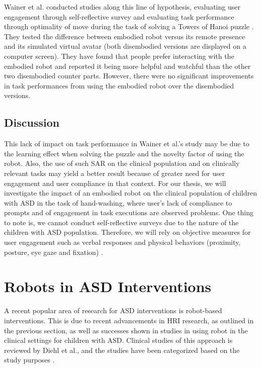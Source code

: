 \documentclass{ut-thesis}
\begin{document}
Wainer et al. conducted studies along this line of hypothesis, evaluating user engagement through self-reflective survey and evaluating task performance through optimality of move during the task of solving a Towers of Hanoi puzzle \cite{wainer2007embodiment}.  They tested the difference between embodied robot versus its remote presence and its simulated virtual avatar (both disembodied versions are displayed on a computer screen).  They have found that people prefer interacting with the embodied robot and reported it being more helpful and watchful than the other two disembodied counter parts.  However, there were no significant improvements in task performances from using the embodied robot over the disembodied versions.


\subsection{Discussion}
This lack of impact on task performance in Wainer et al.'s study may be due to the learning effect when solving the puzzle and the novelty factor of using the robot.  Also, the use of such SAR on the clinical population and on clinically relevant tasks may yield a better result because of greater need for user engagement and user compliance in that context.  For our thesis, we will investigate the impact of an embodied robot on the clinical population of children with ASD in the task of hand-washing, where user's lack of compliance to prompts and of engagement in task executions are observed problems.  One thing to note is, we cannot conduct self-reflective surveys due to the nature of the children with ASD population.  Therefore, we will rely on objective measures for user engagement such as verbal responses and physical behaviors (proximity, posture, eye gaze and ﬁxation) \cite{mataric2005role}.



\section{Robots in ASD Interventions}


A recent popular area of research for ASD interventions is robot-based interventions.  This is due to recent advancements in HRI research, as outlined in the previous section, as well as successes shown in studies in using robot in the clinical settings for children with ASD.  Clinical studies of this approach is reviewed by Diehl et al., and the studies have been categorized based on the study purposes \cite{diehl2012clinical}.
\end{document}

